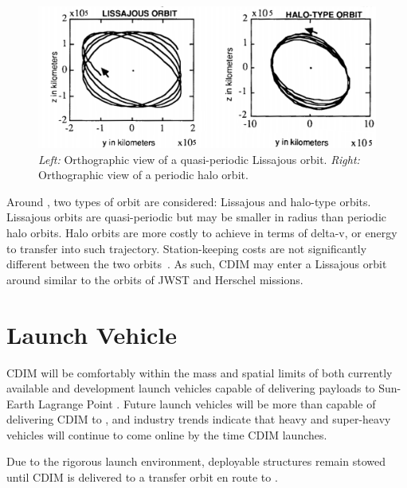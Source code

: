 \documentclass{ws-jai}
\begin{document}
\begin{figure}[!ht]
  \centering
  \includegraphics[width=.6\linewidth]{figs/orbits.png}
  \caption{
      \emph{Left:} Orthographic view of a quasi-periodic Lissajous orbit.
      \emph{Right:} Orthographic view of a periodic halo orbit.~\cite{gordon1993orbit}
\label{fig:orbits}
  }
\end{figure}

Around \Ltwo, two types of orbit are considered: Lissajous and halo-type orbits.
Lissajous orbits are quasi-periodic but may be smaller in radius than periodic halo orbits.
Halo orbits are more costly to achieve in terms of delta-v, or energy to transfer into such trajectory.
Station-keeping costs are not significantly different between the two orbits~\cite{gordon1993orbit}.
As such, CDIM may enter a Lissajous orbit around \Ltwo{} similar to the orbits of JWST and Herschel missions.

\section{Launch Vehicle}
\label{sec:launch}
CDIM will be comfortably within the mass and spatial limits of both currently available and development launch vehicles capable of delivering payloads to Sun-Earth Lagrange Point \Ltwo.
Future launch vehicles will be more than capable of delivering CDIM to \Ltwo, and industry trends indicate that heavy and super-heavy vehicles will continue to come online by the time CDIM launches.

Due to the rigorous launch environment, deployable structures remain stowed until CDIM is delivered to a transfer orbit en route to \Ltwo.
\end{document}
